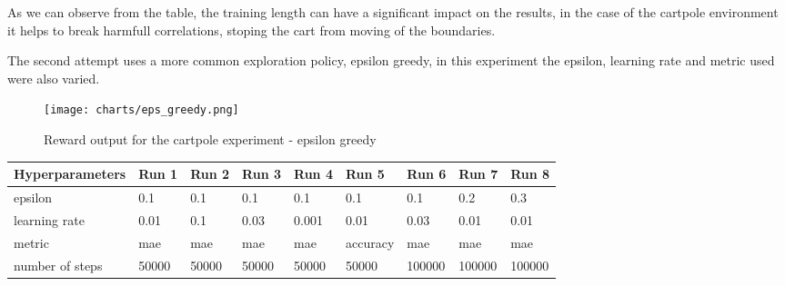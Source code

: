    As we can observe from the table, the training length can have a significant impact on the results, 
   in the case of the cartpole environment it helps to break harmfull correlations, stoping the cart from moving of the boundaries. 

   The second attempt uses a more common exploration policy, epsilon greedy, in this experiment the epsilon, learning rate and metric used were also varied.
   \begin{figure}[H]
       \centering
       \texttt{[image: charts/eps\_greedy.png]}
       \caption{Reward output for the cartpole experiment - epsilon greedy}
    \end{figure}
    
\begin{center}
    \begin{table}[H]
        \begin{tabular}{|l|l|l|l|l|l|l|l|l|}
        \hline
        Hyperparameters & Run 1 & Run 2 & Run 3 & Run 4 & Run 5    & Run 6  & Run 7 & Run 8    \\ \hline
        epsilon         & 0.1   & 0.1   & 0.1   & 0.1   & 0.1      & 0.1    & 0.2   & 0.3      \\ \hline
        learning rate   & 0.01  & 0.1   & 0.03  & 0.001 & 0.01     & 0.03   & 0.01  & 0.01     \\ \hline
        metric          & mae   & mae   & mae   & mae   & accuracy & mae    & mae   & mae      \\ \hline
        number of steps & 50000 & 50000 & 50000 & 50000 & 50000    & 100000 & 100000& 100000   \\ \hline
        \end{tabular}
    \end{table}
\end{center}
    

